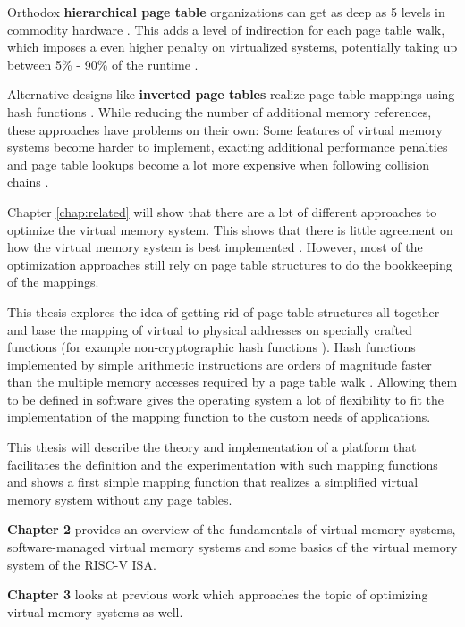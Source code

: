 Orthodox \textbf{hierarchical page table} organizations \cite{tanenbaumOS} can get as deep as 5 levels in commodity hardware \cite{intel5LevelPaging5Level2017}. This adds a level of indirection for each page table walk, which imposes a even higher penalty on virtualized systems, potentially taking up between 5\% - 90\% of the runtime \cite{yaniv2016hash}.

Alternative designs like \textbf{inverted page tables} realize page table mappings using hash functions \cite{tanenbaumOS}. While reducing the number of additional memory references, these approaches have problems on their own: Some features of virtual memory systems become harder to implement, exacting additional performance penalties \cite{yaniv2016hash} and page table lookups become a lot more expensive when following collision chains \cite{jacob1998look}.

Chapter \ref{chap:related} will show that there are a lot of different approaches to optimize the virtual memory system.
This shows that there is little agreement on how the virtual memory system is best implemented \cite{jacob1998look}.
However, most of the optimization approaches still rely on page table structures to do the bookkeeping of the mappings.

This thesis explores the idea of getting rid of page table structures all together and base the mapping of virtual to physical addresses on specially crafted functions (for example non-cryptographic hash functions \cite{mittelbach2021non}).
Hash functions implemented by simple arithmetic instructions are orders of magnitude faster than the multiple memory accesses required by a page table walk \cite{tanenbaumOS}. Allowing them to be defined in software gives the operating system a lot of flexibility to fit the implementation of the mapping function to the custom needs of applications.

This thesis will describe the theory and implementation of a platform that facilitates the definition and the experimentation with such mapping functions and shows a first simple mapping function that realizes a simplified virtual memory system without any page tables.


\textbf{Chapter 2} provides an overview of the fundamentals of virtual memory systems, software-managed virtual memory systems and some basics of the virtual memory system of the RISC-V ISA.

\textbf{Chapter 3} looks at previous work which approaches the topic of optimizing virtual memory systems as well.

